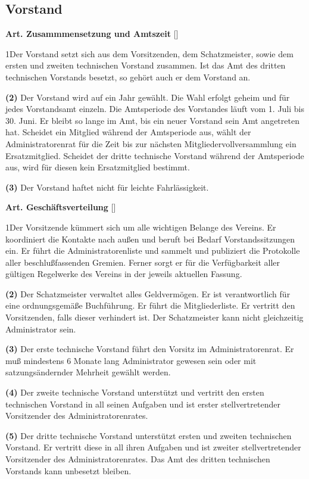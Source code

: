 \documentclass[12pt]{article}
\newcommand{\UAbschnitt}[1]{\subsection{#1}}
\newcommand{\Satz}[2]{

\begin{samepage}
{\bf (#1)} #2
\end{samepage}
}
\newenvironment{Artikel}[2]{
\bigskip \centerline{{\bf Art. #1} [#2]}
\nopagebreak
}{
}
\begin{document}
\UAbschnitt{Vorstand}

\begin{Artikel}{22}{Zusammmensetzung und Amtszeit}

\Satz{1}{Der Vorstand setzt sich aus dem Vorsitzenden, dem Schatzmeister, sowie
dem ersten und zweiten technischen Vorstand zusammen. Ist das Amt des dritten
technischen Vorstands besetzt, so gehört auch er dem Vorstand an.}

\Satz{2}{Der Vorstand wird auf ein Jahr gewählt. Die Wahl erfolgt geheim und
für jedes Vorstandsamt einzeln. Die Amtsperiode des Vorstandes
läuft vom 1. Juli bis 30. Juni. Er bleibt so lange im Amt, bis ein neuer
Vorstand sein Amt angetreten hat. Scheidet ein Mitglied während der Amtsperiode
aus, wählt der Administratorenrat für die Zeit bis zur nächsten
Mitgliedervollversammlung ein Ersatzmitglied. Scheidet der dritte technische
Vorstand während der Amtsperiode aus, wird für diesen kein Ersatzmitglied
bestimmt.}

\Satz{3}{Der Vorstand haftet nicht für leichte Fahrlässigkeit.}

\end{Artikel}

\begin{Artikel}{23}{Geschäftsverteilung}

\Satz{1}{Der Vorsitzende kümmert sich um alle wichtigen Belange des Vereins. Er
koordiniert die Kontakte nach außen und beruft bei Bedarf Vorstandssitzungen
ein. Er führt die Administratorenliste und sammelt und publiziert die
Protokolle aller beschlußfassenden Gremien. Ferner sorgt er für die
Verfügbarkeit aller gültigen Regelwerke des Vereins in der jeweils aktuellen
Fassung.}

\Satz{2}{Der Schatzmeister verwaltet alles Geldvermögen. Er ist verantwortlich
für eine ordnungsgemäße Buchführung. Er führt die Mitgliederliste. Er vertritt
den Vorsitzenden, falls dieser verhindert ist. Der Schatzmeister kann nicht
gleichzeitig Administrator sein.}

\Satz{3}{Der erste technische Vorstand führt den Vorsitz im Administratorenrat.
Er muß mindestens 6 Monate lang Administrator gewesen sein oder mit
satzungsändernder Mehrheit gewählt werden.}

\Satz{4}{Der zweite technische Vorstand unterstützt und vertritt den ersten
technischen Vorstand in all seinen Aufgaben und ist erster stellvertretender
Vorsitzender des Administratorenrates.}

\Satz{5}{Der dritte technische Vorstand unterstützt ersten und zweiten
technischen Vorstand. Er vertritt diese in all ihren Aufgaben und ist zweiter
stellvertretender Vorsitzender des Administratorenrates.
Das Amt des dritten technischen Vorstands kann unbesetzt bleiben.}

\end{Artikel}
\end{document}
